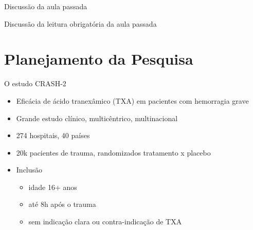 \documentclass{beamer}
\begin{document}

\begin{frame}{Discussão da aula passada}
  \begin{block}{}
    Discussão da leitura obrigatória da aula passada
  \end{block}
\end{frame}

\section{Planejamento da Pesquisa}

\begin{frame}{O estudo CRASH-2}
  \begin{itemize}
    \scriptsize
  \item Eficácia de ácido tranexâmico (TXA) em pacientes com hemorragia grave
    \medskip
  \item Grande estudo clínico, multicêntrico, multinacional
    \medskip
  \item 274 hospitais, 40 países
    \medskip
  \item 20k pacientes de trauma, randomizados tratamento x placebo
    \medskip
  \item Inclusão
    \begin{itemize}
      \scriptsize
    \item idade 16+ anos
    \item até 8h após o trauma
    \item sem indicação clara ou contra-indicação de TXA
    \end{itemize}
  \end{itemize}
\end{frame}
\end{document}
